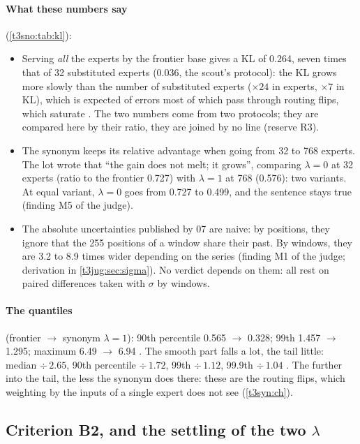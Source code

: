 \paragraph{What these numbers say} (\cref{t3sno:tab:kl}):
\begin{itemize}
\item Serving \emph{all} the experts by the frontier base gives a KL of \num{0.264}, seven times that of 32 substituted experts (\num{0.036}, the scout's protocol): the KL grows more slowly than the number of substituted experts ($\times 24$ in experts, $\times 7$ in KL), which is expected of errors most of which pass through routing flips, which saturate \calc. The two numbers come from two protocols; they are compared here by their ratio, they are joined by no line (reserve R3).
\item The synonym keeps its relative advantage when going from 32 to 768 experts. The lot wrote that ``the gain does not melt; it grows'', comparing $\lambda = 0$ at 32 experts (ratio to the frontier \num{0.727}) with $\lambda = 1$ at 768 (\num{0.576}): two variants. At equal variant, $\lambda = 0$ goes from \num{0.727} to \num{0.499}, and the sentence stays true (finding M5 of the judge).
\item The absolute uncertainties published by 07 are naive: by positions, they ignore that the \num{255} positions of a window share their past. By windows, they are \num{3.2} to \num{8.9} times wider depending on the series (finding M1 of the judge; derivation in \cref{t3jug:sec:sigma}). No verdict depends on them: all rest on paired differences taken with $\sigma$ by windows.
\end{itemize}

\paragraph{The quantiles} (frontier $\to$ synonym $\lambda = 1$): 90th percentile \num{0.565} $\to$ \num{0.328}; 99th \num{1.457} $\to$ \num{1.295}; maximum \num{6.49} $\to$ \num{6.94} \mes. The smooth part falls a lot, the tail little: median $\div\,\num{2.65}$, 90th percentile $\div\,\num{1.72}$, 99th $\div\,\num{1.12}$, 99.9th $\div\,\num{1.04}$ \calc. The further into the tail, the less the synonym does there: these are the routing flips, which weighting by the inputs of a single expert does not see (\cref{t3syn:ch}).

\subsection{Criterion B2, and the settling of the two \texorpdfstring{$\lambda$}{lambda}}\label{t3sno:sec:b2}


